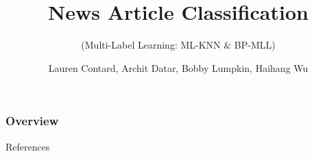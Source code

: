 \documentclass{beamer}
\title{News Article Classification}
\subtitle{(Multi-Label Learning: ML-KNN \& BP-MLL)}
\author[STAT 6500]{Lauren Contard, Archit Datar, Bobby Lumpkin, Haihang Wu}
\institute[OSU] %
{
The Ohio State University \\ %
\medskip
STAT 6500 %
}
\date{}
\begin{document}
\frame{\titlepage}

\begin{frame}
\frametitle{Overview} %
\tableofcontents %
\end{frame}

\begin{frame}[t]{References}
    \nocite{mlknn}
    \nocite{bpmll}
    
\end{frame}
\end{document}
